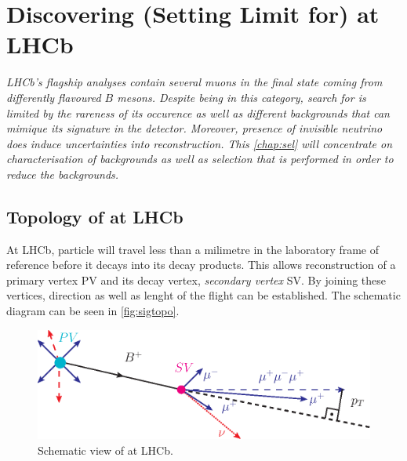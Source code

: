 
\chapter{Discovering (Setting Limit for) \boldmath{\Bmumumu} at LHCb}

\label{chap:sel}

\textit{LHCb's flagship analyses contain several muons in the final state coming from differently flavoured $B$ mesons. Despite being in this category, search for \Bmumumu is limited by the rareness of its occurence as well as different backgrounds that can mimique its signature in the detector. Moreover, presence of invisible neutrino does induce uncertainties into reconstruction. This \autoref{chap:sel} will concentrate on characterisation of backgrounds as well as selection that is performed in order to reduce the backgrounds.}


\section{Topology of \Bmumumu at LHCb}

At \Gls{LHCb}, \Bpm particle will travel less than a milimetre in the laboratory frame of reference before it decays into its decay products. This allows reconstruction of a primary vertex \Gls{PV} and its decay vertex, \textit{secondary vertex} \Gls{SV}. By joining these vertices, direction as well as lenght of the \Bpm flight can be established. The schematic diagram can be seen in \autoref{fig:sigtopo}.

\begin{figure}
  \centering
  \includegraphics[scale = 1.0]{figs/sel/DecReco_fin.eps}
	\caption{Schematic view of \Bmumumu at \Gls{LHCb}.}
  \label{fig:sigtopo}
\end{figure}

